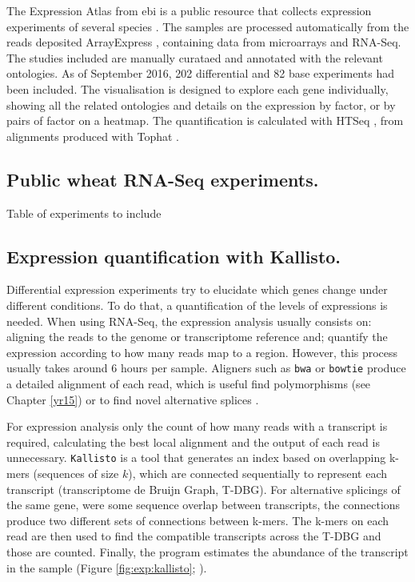 The Expression Atlas from \acrshort{ebi} is a public resource that collects expression experiments of several species \citep{Petryszak2016}. 
The samples are processed automatically from the reads deposited ArrayExpress \citep{Kolesnikov2015}, containing data from microarrays and RNA-Seq.
The studies included are manually curataed and annotated with the relevant ontologies. 
As of September 2016, 202 differential and 82 base experiments had been included. 
The visualisation is designed to explore each gene individually, showing all the related ontologies and details on the expression by factor, or by pairs of factor on a heatmap. 
The quantification is calculated with HTSeq \citep{Anders2015}, from alignments produced with Tophat \citep{Ling2013}.



\subsection{Public wheat RNA-Seq experiments.}

Table of experiments to include 


\subsection{Expression quantification with Kallisto.}

Differential expression experiments try to elucidate which genes change under different conditions. 
To do that, a quantification of the levels of expressions is needed. 
When using RNA-Seq, the expression analysis usually consists on: aligning the reads to the genome or transcriptome reference and; quantify the expression according to how many reads map to a region. 
However, this process usually takes around 6 hours per sample. 
Aligners such as \texttt{bwa} or \texttt{bowtie} produce a detailed alignment of each read, which is useful find polymorphisms (see Chapter \ref{yr15}) or to find novel alternative splices \citep{Trapnell2012}. 

For expression analysis only the count of how many reads with a transcript is required, calculating the best local alignment and the output of each read is unnecessary. 
\verb|Kallisto| is a tool that generates an index based on overlapping k-mers (sequences of size $k$), which are connected sequentially to represent each transcript (transcriptome de Bruijn Graph, T-DBG). 
For alternative splicings of the same gene, were some sequence overlap between transcripts, the connections produce two different sets of connections between k-mers. 
The k-mers on each read are then used to find the compatible transcripts across the T-DBG and those are counted. 
Finally, the program estimates the abundance of the transcript in the sample (Figure \ref{fig:exp:kallisto}; \citealt{Bray2016}).  


